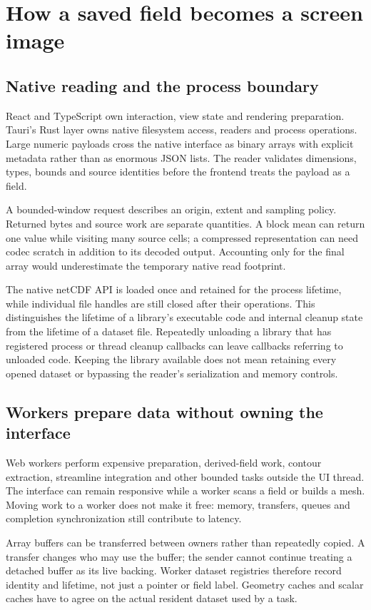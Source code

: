 \section{How a saved field becomes a screen image}
\subsection{Native reading and the process boundary}
React and TypeScript own interaction, view state and rendering preparation.
Tauri's Rust layer owns native filesystem access, readers and process operations.
Large numeric payloads cross the native interface as binary arrays with explicit
metadata rather than as enormous JSON lists. The reader validates dimensions,
types, bounds and source identities before the frontend treats the payload as a
field.

A bounded-window request describes an origin, extent and sampling policy.
Returned bytes and source work are separate quantities. A block mean can return
one value while visiting many source cells; a compressed representation can need
codec scratch in addition to its decoded output. Accounting only for the final
array would underestimate the temporary native read footprint.

The native netCDF API is loaded once and retained for the process lifetime,
while individual file handles are still closed after their operations. This
distinguishes the lifetime of a library's executable code and internal cleanup
state from the lifetime of a dataset file. Repeatedly unloading a library that
has registered process or thread cleanup callbacks can leave callbacks referring
to unloaded code. Keeping the library available does not mean retaining every
opened dataset or bypassing the reader's serialization and memory controls.

\subsection{Workers prepare data without owning the interface}
Web workers perform expensive preparation, derived-field work, contour
extraction, streamline integration and other bounded tasks outside the UI thread.
The interface can remain responsive while a worker scans a field or builds a
mesh. Moving work to a worker does not make it free: memory, transfers, queues
and completion synchronization still contribute to latency.

Array buffers can be transferred between owners rather than repeatedly copied.
A transfer changes who may use the buffer; the sender cannot continue treating a
detached buffer as its live backing. Worker dataset registries therefore record
identity and lifetime, not just a pointer or field label. Geometry caches and
scalar caches have to agree on the actual resident dataset used by a task.

